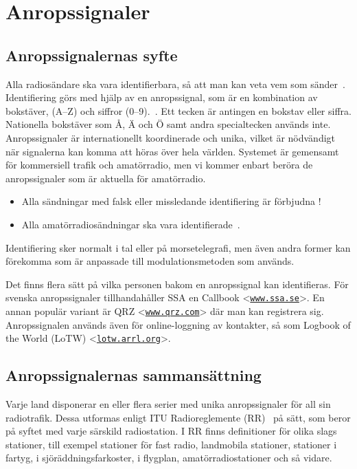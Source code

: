 \section{Anropssignaler}
\label{anropssignaler}

\subsection{Anropssignalernas syfte}

Alla radiosändare ska vara identifierbara, så att man kan veta vem som
sänder~\cite[\S19.1]{ITU-RR}.
Identifiering görs med hjälp av en anropssignal, som är en kombination av
bokstäver, (A--Z) och siffror (0--9).~\cite[\S19.45]{ITU-RR}.
Ett tecken är antingen en bokstav eller siffra.
Nationella bokstäver som Å, Ä och Ö samt andra specialtecken används inte.
Anropssignaler är internationellt koordinerade och unika, vilket är nödvändigt
när signalerna kan komma att höras över hela världen.
Systemet är gemensamt för kommersiell trafik och amatörradio, men vi kommer
enbart beröra de anropssignaler som är aktuella för amatörradio.

\begin{itemize}
\item Alla sändningar med falsk eller missledande identifiering är förbjudna
\cite[\S19.2]{ITU-RR}!

\item Alla amatörradiosändningar ska vara identifierade~\cite[\S19.4, \S19.5]{ITU-RR}.
\end{itemize}

Identifiering sker normalt i tal eller på morsetelegrafi, men även andra former
kan förekomma som är anpassade till modulationsmetoden som används.

Det finns flera sätt på vilka personen bakom en anropssignal kan identifieras.
För svenska anropssignaler tillhandahåller SSA en Callbook
<\href{https://www.ssa.se/}{\texttt{www.ssa.se}}>.
En annan populär variant är QRZ
<\href{https://www.qrz.com/}{\texttt{www.qrz.com}}> där man kan registrera sig.
Anropssignalen används även för online-loggning av kontakter, så som Logbook of
the World (LoTW) <\href{https://lotw.arrl.org/}{\texttt{lotw.arrl.org}}>.

\subsection{Anropssignalernas sammansättning}

Varje land disponerar en eller flera serier med unika anropssignaler för all
sin radiotrafik.
Dessa utformas enligt ITU Radioreglemente (RR)~\cite[\S19]{ITU-RR} på sätt,
som beror på syftet med varje särskild radiostation.
I RR finns definitioner för olika slags stationer, till exempel stationer för
fast radio, landmobila stationer, stationer i fartyg, i sjöräddningsfarkoster,
i flygplan, amatörradiostationer och så vidare.


